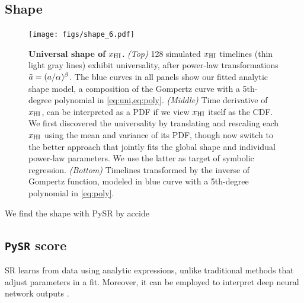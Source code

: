 \subsection*{Shape}
\label{ssec:shape}

\begin{figure}[tb]
\centering
\texttt{[image: figs/shape\_6.pdf]}
\caption{\textbf{Universal shape of $x_{\mathrm{HI}}$.}
\emph{(Top)} 128 simulated $x_{\mathrm{HI}}$ timelines (thin light gray lines)
exhibit universality, after power-law transformations $\tilde{a} =
(a/\alpha)^\beta$.
The blue curves in all panels show our fitted analytic shape model, a
composition of the Gompertz curve with a 5th-degree polynomial in
\cref{eq:uni,eq:poly}.
\emph{(Middle)} Time derivative of $x_{\mathrm{HI}}$, can be interpreted as a PDF
if we view $x_{\mathrm{HI}}$ itself as the CDF.
We first discovered the universality by translating and rescaling each
$x_{\mathrm{HI}}$ using the mean and variance of its PDF, though now switch to the
better approach that jointly fits the global shape and individual
power-law parameters.
We use the latter as target of symbolic regression.
\emph{(Bottom)} Timelines transformed by the inverse of Gompertz
function, modeled in blue curve with a 5th-degree polynomial in
\cref{eq:poly}.}
\label{fig:shape}
\end{figure}

We find the shape with PySR by accide


\subsection*{\texttt{PySR} score}
\label{ssec:pysr}

SR learns from data using analytic expressions, unlike traditional
methods that adjust parameters in a fit.
Moreover, it can be employed to interpret deep neural network outputs
\cite{Cranmer2020b}.



